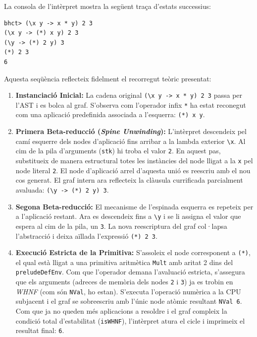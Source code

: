 La consola de l'intèrpret mostra la següent traça d'estats successius:

\begin{lstlisting}[style=haskellstyle, caption=Traça d'avaluació de la currificació i reducció de l'expressió guia]
bhct> (\x y -> x * y) 2 3
(\x y -> (*) x y) 2 3
(\y -> (*) 2 y) 3
(*) 2 3
6
\end{lstlisting}

Aquesta seqüència reflecteix fidelment el recorregut teòric presentat:

\begin{enumerate}
    \item \textbf{Instanciació Inicial:} La cadena original \texttt{(\textbackslash x y -> x * y) 2 3} passa per l'AST i es bolca al graf. S'observa com l'operador infix \texttt{*} ha estat reconegut com una aplicació predefinida associada a l'esquerra: \texttt{(*) x y}.
    \item \textbf{Primera Beta-reducció (\textit{Spine Unwinding}):} L'intèrpret descendeix pel camí esquerre dels nodes d'aplicació fins arribar a la lambda exterior \texttt{\textbackslash x}. Al cim de la pila d'arguments (\texttt{stk}) hi troba el valor \texttt{2}. En aquest pas, substitueix de manera estructural totes les instàncies del node lligat a la \texttt{x} pel node literal \texttt{2}. El node d'aplicació arrel d'aquesta unió es reescriu amb el nou cos generat. El graf intern ara reflecteix la clàusula currificada parcialment avaluada: \texttt{(\textbackslash y -> (*) 2 y) 3}.
    \item \textbf{Segona Beta-reducció:} El mecanisme de l'espinada esquerra es repeteix per a l'aplicació restant. Ara es descendeix fins a \texttt{\textbackslash y} i se li assigna el valor que espera al cim de la pila, un \texttt{3}. La nova reescriptura del graf col·lapsa l'abstracció i deixa aïllada l'expressió \texttt{(*) 2 3}.
    \item \textbf{Execució Estricta de la Primitiva:} S'assoleix el node corresponent a \texttt{(*)}, el qual està lligat a una primitiva aritmètica \texttt{Mult} amb aritat 2 dins del \texttt{preludeDefEnv}. Com que l'operador demana l'avaluació estricta, s'assegura que els arguments (adreces de memòria dels nodes \texttt{2} i \texttt{3}) ja es trobin en \textit{WHNF} (com són \texttt{NVal}, ho estan). S'executa l'operació numèrica a la CPU subjacent i el graf se sobreescriu amb l'únic node atòmic resultant \texttt{NVal 6}. Com que ja no queden més aplicacions a resoldre i el graf compleix la condició total d'estabilitat (\texttt{isWHNF}), l'intèrpret atura el cicle i imprimeix el resultat final: \texttt{6}.
\end{enumerate}